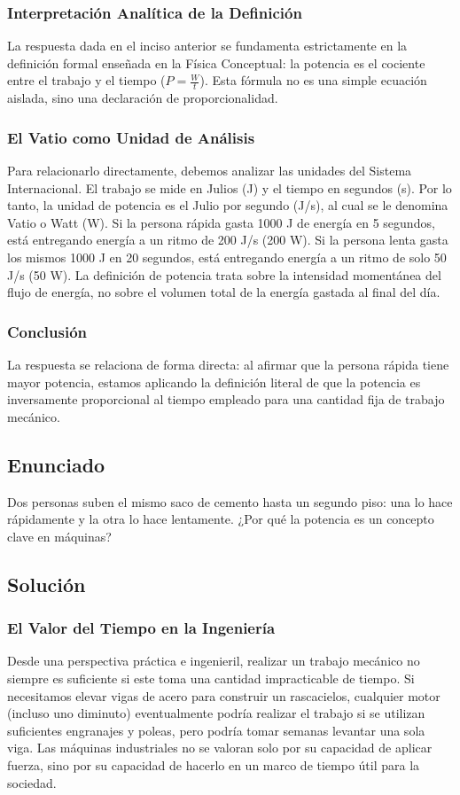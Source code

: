 \documentclass[a4paper,12pt]{article}
\begin{document}
\subsubsection*{Interpretación Analítica de la Definición}
La respuesta dada en el inciso anterior se fundamenta estrictamente en la definición formal enseñada en la Física Conceptual: la potencia es el cociente entre el trabajo y el tiempo ($P = \frac{W}{t}$). Esta fórmula no es una simple ecuación aislada, sino una declaración de proporcionalidad. 

\subsubsection*{El Vatio como Unidad de Análisis}
Para relacionarlo directamente, debemos analizar las unidades del Sistema Internacional. El trabajo se mide en Julios (J) y el tiempo en segundos (s). Por lo tanto, la unidad de potencia es el Julio por segundo (J/s), al cual se le denomina Vatio o Watt (W). 
Si la persona rápida gasta 1000 J de energía en 5 segundos, está entregando energía a un ritmo de 200 J/s (200 W).
Si la persona lenta gasta los mismos 1000 J en 20 segundos, está entregando energía a un ritmo de solo 50 J/s (50 W).
La definición de potencia trata sobre la intensidad momentánea del flujo de energía, no sobre el volumen total de la energía gastada al final del día.

\subsubsection*{Conclusión}
La respuesta se relaciona de forma directa: al afirmar que la persona rápida tiene mayor potencia, estamos aplicando la definición literal de que la potencia es inversamente proporcional al tiempo empleado para una cantidad fija de trabajo mecánico.

\newpage
\subsection*{Enunciado}
Dos personas suben el mismo saco de cemento hasta un segundo piso: una lo hace rápidamente y la otra lo hace lentamente.
¿Por qué la potencia es un concepto clave en máquinas?

\subsection*{Solución}

\subsubsection*{El Valor del Tiempo en la Ingeniería}
Desde una perspectiva práctica e ingenieril, realizar un trabajo mecánico no siempre es suficiente si este toma una cantidad impracticable de tiempo. Si necesitamos elevar vigas de acero para construir un rascacielos, cualquier motor (incluso uno diminuto) eventualmente podría realizar el trabajo si se utilizan suficientes engranajes y poleas, pero podría tomar semanas levantar una sola viga. Las máquinas industriales no se valoran solo por su capacidad de aplicar fuerza, sino por su capacidad de hacerlo en un marco de tiempo útil para la sociedad.
\end{document}
